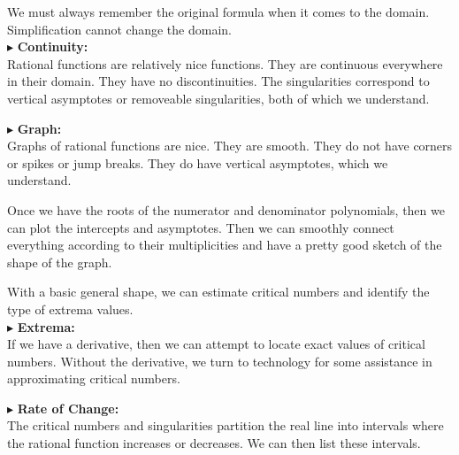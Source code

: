 \documentclass{ximera}
\begin{document}
We must always remember the original formula when it comes to the domain.  Simplification cannot change the domain. \\





$\blacktriangleright$ \textbf{\textcolor{red!10!blue!90!}{Continuity:}} \\
Rational functions are relatively nice functions.  They are continuous everywhere in their domain.  They have no discontinuities.  The singularities correspond to vertical asymptotes or removeable singularities, both of which we understand.  



$\blacktriangleright$ \textbf{\textcolor{red!10!blue!90!}{Graph:}} \\
Graphs of rational functions are nice.  They are smooth.  They do not have corners or spikes or jump breaks. They do have vertical asymptotes, which we understand.


Once we have the roots of the numerator and denominator polynomials, then we can plot the intercepts and asymptotes.  Then we can smoothly connect everything according to their multiplicities and have a pretty good sketch of the shape of the graph.

With a basic general shape, we can estimate critical numbers and identify the type of extrema values. \\




$\blacktriangleright$ \textbf{\textcolor{red!10!blue!90!}{Extrema:}} \\
If we have a derivative, then we can attempt to locate exact values of critical numbers.  Without the derivative, we turn to technology for some assistance in approximating critical numbers.




$\blacktriangleright$ \textbf{\textcolor{red!10!blue!90!}{Rate of Change:}} \\
The critical numbers and singularities partition the real line into intervals where the rational function increases or decreases.  We can then list these intervals.
\end{document}
